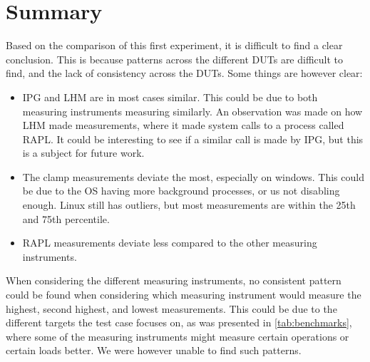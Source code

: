 \section{Summary}

Based on the comparison of this first experiment, it is difficult to find a clear conclusion. This is because patterns across the different DUTs are difficult to find, and the lack of consistency across the DUTs. Some things are however clear:

\begin{itemize}
    \item IPG and LHM are in most cases similar. This could be due to both measuring instruments measuring similarly. An observation was made on how LHM made measurements, where it made system calls to a process called RAPL. It could be interesting to see if a similar call is made by IPG, but this is a subject for future work.
    \item The clamp measurements deviate the most, especially on windows. This could be due to the OS having more background processes, or us not disabling enough. Linux still has outliers, but most measurements are within the 25th and 75th percentile.
    \item RAPL measurements deviate less compared to the other measuring instruments.
\end{itemize}

When considering the different measuring instruments, no consistent pattern could be found when considering which measuring instrument would measure the highest, second highest, and lowest measurements. This could be due to the different targets the test case focuses on, as was presented in \cref{tab:benchmarks}, where some of the measuring instruments might measure certain operations or certain loads better. We were however unable to find such patterns.

